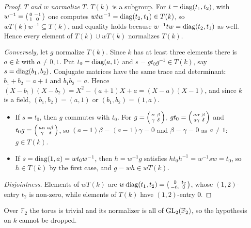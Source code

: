 \begin{theorem}
\end{theorem}
\begin{proof}
\emph{$T$ and $w$ normalize $T$.} $T(k)$ is a subgroup. For $t=\operatorname{diag}(t_1,t_2)$, with
$w^{-1}=\begin{psmallmatrix}0&-1\\1&0\end{psmallmatrix}$ one computes $wtw^{-1}=\operatorname{diag}(t_2,t_1)\in T(k)$, so
$wT(k)w^{-1}\subseteq T(k)$, and equality holds because $w^{-1}tw=\operatorname{diag}(t_2,t_1)$ as well. Hence every element of
$T(k)\cup wT(k)$ normalizes $T(k)$.

\emph{Conversely,} let $g$ normalize $T(k)$. Since $k$ has at least three elements there is $a\in k$ with
$a\neq0,1$. Put $t_0=\operatorname{diag}(a,1)$ and $s=gt_0g^{-1}\in T(k)$, say $s=\operatorname{diag}(b_1,b_2)$. Conjugate matrices have the same
trace and determinant: $b_1+b_2=a+1$ and $b_1b_2=a$. Hence $(X-b_1)(X-b_2)=X^2-(a+1)X+a=(X-a)(X-1)$, and since $k$ is
a field, $(b_1,b_2)=(a,1)$ or $(b_1,b_2)=(1,a)$.
\begin{itemize}
\item If $s=t_0$, then $g$ commutes with $t_0$. For $g=\begin{psmallmatrix}\alpha&\beta\\\gamma&\delta\end{psmallmatrix}$,
  $gt_0=\begin{psmallmatrix}a\alpha&\beta\\a\gamma&\delta\end{psmallmatrix}$ and
  $t_0g=\begin{psmallmatrix}a\alpha&a\beta\\\gamma&\delta\end{psmallmatrix}$, so $(a-1)\beta=(a-1)\gamma=0$ and
  $\beta=\gamma=0$ as $a\neq1$: $g\in T(k)$.
\item If $s=\operatorname{diag}(1,a)=wt_0w^{-1}$, then $h=w^{-1}g$ satisfies $ht_0h^{-1}=w^{-1}sw=t_0$, so $h\in T(k)$ by the first
  case, and $g=wh\in wT(k)$.
\end{itemize}
\emph{Disjointness.} Elements of $wT(k)$ are $w\operatorname{diag}(t_1,t_2)=\begin{psmallmatrix}0&t_2\\-t_1&0\end{psmallmatrix}$,
whose $(1,2)$-entry $t_2$ is non-zero, while elements of $T(k)$ have $(1,2)$-entry $0$.
\end{proof}
\noindent Over $\mathbb F_2$ the torus is trivial and its normalizer is all of $\mathrm{GL}_2(\mathbb F_2)$, so the hypothesis
on $k$ cannot be dropped.

